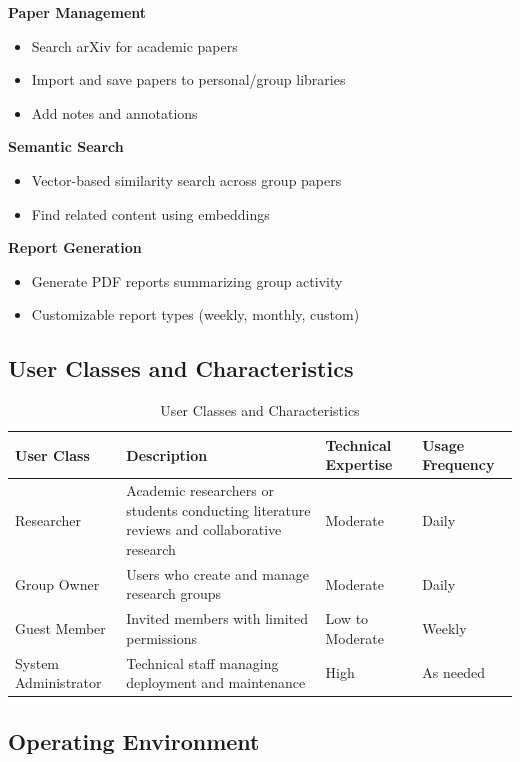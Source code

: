 \documentclass[11pt,a4paper]{article}
\begin{document}
\textbf{Paper Management}
\begin{itemize}
    \item Search arXiv for academic papers
    \item Import and save papers to personal/group libraries
    \item Add notes and annotations
\end{itemize}

\textbf{Semantic Search}
\begin{itemize}
    \item Vector-based similarity search across group papers
    \item Find related content using embeddings
\end{itemize}

\textbf{Report Generation}
\begin{itemize}
    \item Generate PDF reports summarizing group activity
    \item Customizable report types (weekly, monthly, custom)
\end{itemize}

\subsection{User Classes and Characteristics}

\begin{table}[H]
\centering
\begin{tabular}{p{3cm}p{5cm}p{3cm}p{2.5cm}}
\toprule
\textbf{User Class} & \textbf{Description} & \textbf{Technical Expertise} & \textbf{Usage Frequency} \\
\midrule
Researcher & Academic researchers or students conducting literature reviews and collaborative research & Moderate & Daily \\
Group Owner & Users who create and manage research groups & Moderate & Daily \\
Guest Member & Invited members with limited permissions & Low to Moderate & Weekly \\
System Administrator & Technical staff managing deployment and maintenance & High & As needed \\
\bottomrule
\end{tabular}
\caption{User Classes and Characteristics}
\end{table}

\subsection{Operating Environment}
\end{document}
